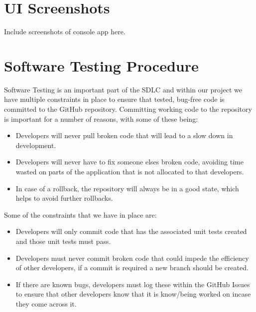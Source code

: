 \documentclass[
  english,
  a4paper,
,tablecaptionabove
]{scrartcl}
\providecommand{\tightlist}{%
  \setlength{\itemsep}{0pt}\setlength{\parskip}{0pt}}
\begin{document}
\newpage

\hypertarget{ui-screenshots}{%
\section{UI Screenshots}\label{ui-screenshots}}

Include screenshots of console app here.

\newpage

\hypertarget{software-testing-procedure}{%
\section{Software Testing Procedure}\label{software-testing-procedure}}

Software Testing is an important part of the SDLC and within our project
we have multiple constraints in place to ensure that tested, bug-free
code is committed to the GitHub repository. Committing working code to
the repository is important for a number of reasons, with some of these
being:

\begin{itemize}
\tightlist
\item
  Developers will never pull broken code that will lead to a slow down
  in development.
\item
  Developers will never have to fix someone elses broken code, avoiding
  time wasted on parts of the application that is not allocated to that
  developers.
\item
  In case of a rollback, the repository will always be in a good state,
  which helps to avoid further rollbacks.
\end{itemize}

Some of the constraints that we have in place are:

\begin{itemize}
\tightlist
\item
  Developers will only commit code that has the associated unit tests
  created and those unit tests must pass.
\item
  Developers must never commit broken code that could impede the
  efficiency of other developers, if a commit is required a new branch
  should be created.
\item
  If there are known bugs, developers must log these within the GitHub
  Issues to ensure that other developers know that it is know/being
  worked on incase they come across it.
\end{itemize}
\end{document}
